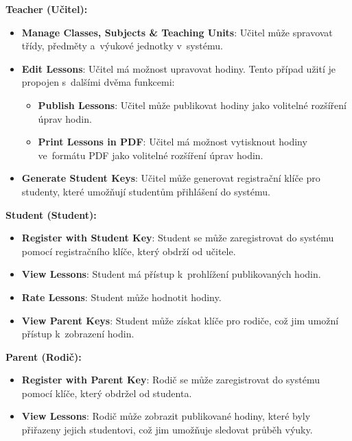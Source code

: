 \documentclass[male,czech,api_bc]{kitheses}
\begin{document}
\textbf{Teacher (Učitel):}
\begin{itemize}
	\item \textbf{Manage Classes, Subjects \& Teaching Units}: Učitel může spravovat třídy, předměty a~výukové jednotky v~systému.
	\item \textbf{Edit Lessons}: Učitel má možnost upravovat hodiny. Tento případ užití je propojen s~dalšími dvěma funkcemi:
	\begin{itemize}
		\item \textbf{Publish Lessons}: Učitel může publikovat hodiny jako volitelné rozšíření úprav hodin.
		\item \textbf{Print Lessons in PDF}: Učitel má možnost vytisknout hodiny ve~formátu PDF jako volitelné rozšíření úprav hodin.
	\end{itemize}
	\item \textbf{Generate Student Keys}: Učitel může generovat registrační klíče pro studenty, které umožňují studentům přihlášení do systému.
\end{itemize}

\vspace{1em}
\textbf{Student (Student):}
\begin{itemize}
	\item \textbf{Register with Student Key}: Student se může zaregistrovat do systému pomocí registračního klíče, který obdrží od učitele.
	\item \textbf{View Lessons}: Student má přístup k~prohlížení publikovaných hodin.
	\item \textbf{Rate Lessons}: Student může hodnotit hodiny.
	\item \textbf{View Parent Keys}: Student může získat klíče pro rodiče, což jim umožní přístup k~zobrazení hodin.
\end{itemize}

\vspace{1em}
\textbf{Parent (Rodič):}
\begin{itemize}
	\item \textbf{Register with Parent Key}: Rodič se může zaregistrovat do systému pomocí klíče, který obdržel od studenta.
	\item \textbf{View Lessons}: Rodič může zobrazit publikované hodiny, které byly přiřazeny jejich studentovi, což jim umožňuje sledovat průběh výuky.
\end{itemize}
\end{document}
